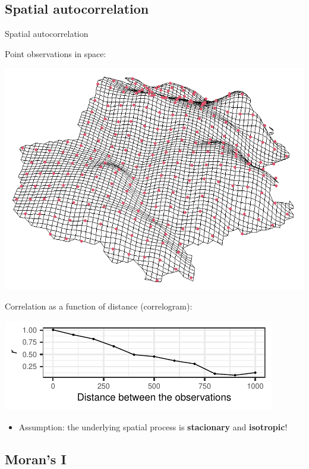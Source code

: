 \documentclass[
  ignorenonframetext,
]{beamer}
\providecommand{\tightlist}{%
  \setlength{\itemsep}{0pt}\setlength{\parskip}{0pt}}
\begin{document}
\hypertarget{spatial-autocorrelation-1}{%
\subsection{Spatial autocorrelation}\label{spatial-autocorrelation-1}}

\begin{frame}{Spatial autocorrelation}
\small

Point observations in space:

\includegraphics[width=10.17in,height=0.3\textheight]{terrain2}

Correlation as a function of distance (correlogram):

\includegraphics{Lecture_1_files/figure-beamer/unnamed-chunk-8-1.pdf}

\begin{itemize}
\tightlist
\item
  Assumption: the underlying spatial process is \textbf{stacionary} and
  \textbf{isotropic}!
\end{itemize}
\end{frame}

\hypertarget{morans-i}{%
\subsection{Moran's I}\label{morans-i}}
\end{document}
